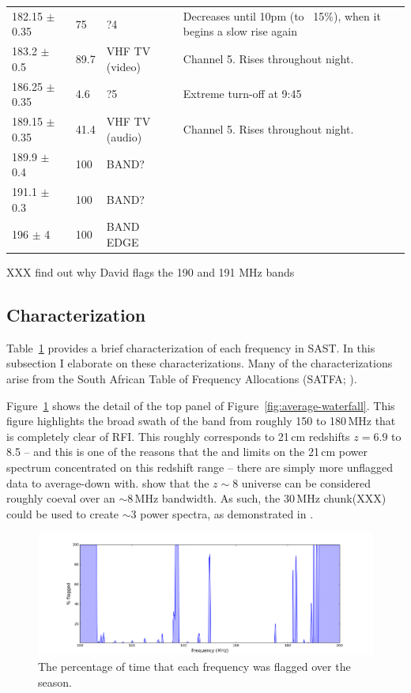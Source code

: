\documentclass[10pt,a4paper]{article}
\begin{document}
\begin{table}
\begin{tabular}{llll}
182.15	$\pm$	0.35	&	75	&	?4	&	Decreases until 10pm (to ~15\%), when it begins a slow rise again	\\
183.2	$\pm$	0.5	&	89.7	&	VHF TV (video)	&	Channel 5. Rises throughout night. 	\\
186.25	$\pm$	0.35	&	4.6	&	?5	&	Extreme turn-off at 9:45	\\
189.15	$\pm$	0.35	&	41.4	&	VHF TV (audio)	&	Channel 5. Rises throughout night. 	\\
189.9	$\pm$	0.4	&	100	&	BAND?	&	\\
191.1	$\pm$	0.3	&	100	&	BAND?	&	\\
196	$\pm$	4	&	100	&	BAND EDGE	&	\\
\hline
\end{tabular}
XXX find out why David flags the 190 and 191 MHz bands
\label{tab:main}
\end{table}

\subsection{Characterization}

Table~\ref{tab:main} provides a brief characterization of each frequency in SAST. In this subsection I elaborate on these characterizations. Many of the characterizations arise from the South African Table of Frequency Allocations (SATFA; \cite{SAFreqTable}).

Figure~\ref{fig:freqflags} shows the detail of the top panel of Figure~\ref{fig:average-waterfall}. This figure highlights the broad swath of the band from roughly 150 to 180\,MHz that is completely clear of RFI. This roughly corresponds to 21\,cm redshifts $z=6.9$ to 8.5 -- and this is one of the reasons that the \cite{Parsons.14} and \cite{Ali.15} limits on the 21\,cm power spectrum concentrated on this redshift range -- there are simply more unflagged data to average-down with. \cite{Furlanetto.06} show that the $z\sim8$ universe can be considered roughly coeval over an $\sim$8\,MHz bandwidth. As such, the 30\,MHz chunk(XXX) could be used to create $\sim$3 power spectra, as demonstrated in \cite{Jacobs.15}.

\begin{figure}
\centering
\includegraphics[width=\textwidth]{RFI-images/149days-freq.png}
\caption{The percentage of time that each frequency was flagged over the season.}
\label{fig:freqflags}
\end{figure}
\end{document}
